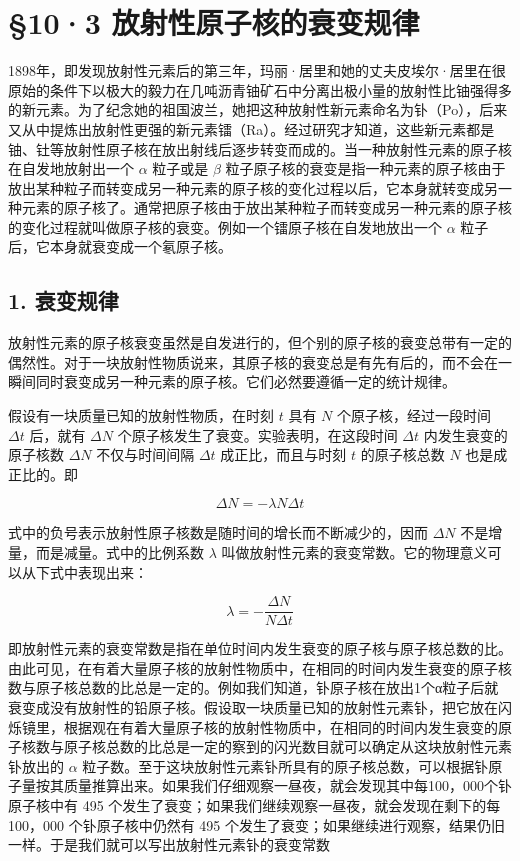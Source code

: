 \section{§10·3
放射性原子核的衰变规律}

1898年，即发现放射性元素后的第三年，玛丽·居里和她的丈夫皮埃尔·居里在很原始的条件下以极大的毅力在几吨沥青铀矿石中分离出极小量的放射性比铀强得多的新元素。为了纪念她的祖国波兰，她把这种放射性新元素命名为钋（Po），后来又从中提炼出放射性更强的新元素镭（Ra）。经过研究才知道，这些新元素都是铀、钍等放射性原子核在放出射线后逐步转变而成的。当一种放射性元素的原子核在自发地放射出一个
\(\alpha\) 粒子或是 \(\beta\)
粒子原子核的衰变是指一种元素的原子核由于放出某种粒子而转变成另一种元素的原子核的变化过程以后，它本身就转变成另一种元素的原子核了。通常把原子核由于放出某种粒子而转变成另一种元素的原子核的变化过程就叫做原子核的衰变。例如一个镭原子核在自发地放出一个
\(\alpha\) 粒子后，它本身就衰变成一个氡原子核。

\subsection{1. 衰变规律}

放射性元素的原子核衰变虽然是自发进行的，但个别的原子核的衰变总带有一定的偶然性。对于一块放射性物质说来，其原子核的衰变总是有先有后的，而不会在一瞬间同时衰变成另一种元素的原子核。它们必然要遵循一定的统计规律。

假设有一块质量已知的放射性物质，在时刻 \(t\) 具有 \(N\)
个原子核，经过一段时间 \(\Delta t\) 后，就有 \(\Delta N\)
个原子核发生了衰变。实验表明，在这段时间 \(\Delta t\)
内发生衰变的原子核数 \(\Delta N\) 不仅与时间间隔 \(\Delta t\)
成正比，而且与时刻 \(t\) 的原子核总数 \(N\) 也是成正比的。即

\[
\Delta N = - \lambda N \Delta t \tag {10.1}
\]

式中的负号表示放射性原子核数是随时间的增长而不断减少的，因而
\(\Delta N\) 不是增量，而是减量。式中的比例系数 \(\lambda\)
叫做放射性元素的衰变常数。它的物理意义可以从下式中表现出来：

\[
\lambda = - \frac {\Delta N}{N \Delta t} \tag {10.2}
\]

即放射性元素的衰变常数是指在单位时间内发生衰变的原子核与原子核总数的比。由此可见，在有着大量原子核的放射性物质中，在相同的时间内发生衰变的原子核数与原子核总数的比总是一定的。例如我们知道，钋原子核在放出1个α粒子后就衰变成没有放射性的铅原子核。假设取一块质量已知的放射性元素钋，把它放在闪烁镜里，根据观在有着大量原子核的放射性物质中，在相同的时间内发生衰变的原子核数与原子核总数的比总是一定的察到的闪光数目就可以确定从这块放射性元素钋放出的
\(\alpha\)
粒子数。至于这块放射性元素钋所具有的原子核总数，可以根据钋原子量按其质量推算出来。如果我们仔细观察一昼夜，就会发现其中每100，000个钋原子核中有
495 个发生了衰变；如果我们继续观察一昼夜，就会发现在剩下的每 100，000
个钋原子核中仍然有 495
个发生了衰变；如果继续进行观察，结果仍旧一样。于是我们就可以写出放射性元素钋的衰变常数

